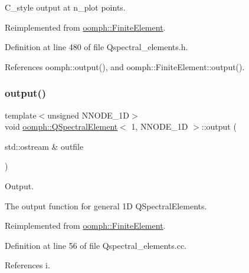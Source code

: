 C\+\_\+style output at n\+\_\+plot points. 



Reimplemented from \hyperlink{classoomph_1_1FiniteElement_adfaee690bb0608f03320eeb9d110d48c}{oomph\+::\+Finite\+Element}.



Definition at line 480 of file Qspectral\+\_\+elements.\+h.



References oomph\+::output(), and oomph\+::\+Finite\+Element\+::output().

\mbox{\label{classoomph_1_1QSpectralElement_3_011_00_01NNODE__1D_01_4_a20b741c9b2523979612d2b63b3b05006}} 
\subsubsection{\texorpdfstring{output()}{output()}\hspace{0.1cm}{\footnotesize\ttfamily [3/4]}}
{\footnotesize\ttfamily template$<$unsigned N\+N\+O\+D\+E\+\_\+1D$>$ \\
void \hyperlink{classoomph_1_1QSpectralElement}{oomph\+::\+Q\+Spectral\+Element}$<$ 1, N\+N\+O\+D\+E\+\_\+1D $>$\+::output (\begin{DoxyParamCaption}\item[{std\+::ostream \&}]{outfile }\end{DoxyParamCaption})\hspace{0.3cm}{\ttfamily [virtual]}}



Output. 

The output function for general 1D Q\+Spectral\+Elements. 

Reimplemented from \hyperlink{classoomph_1_1FiniteElement_a2ad98a3d2ef4999f1bef62c0ff13f2a7}{oomph\+::\+Finite\+Element}.



Definition at line 56 of file Qspectral\+\_\+elements.\+cc.



References i.

\mbox{\label{classoomph_1_1QSpectralElement_3_011_00_01NNODE__1D_01_4_a8951704e35bc73c46e22554c75821803}} 
